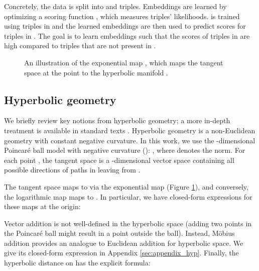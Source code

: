 \documentclass[11pt,a4paper]{article}
\begin{document}
Concretely, the data is split into  and  triples. 
Embeddings are learned by optimizing a scoring function , which measures triples' likelihoods.
 is trained using triples in  and the learned embeddings are then used to predict scores for triples in . 
The goal is to learn embeddings such that the scores of triples in  are high compared to triples that are not present in .  
\begin{figure}[t]
\centering
{}

\caption{An illustration of the exponential map  , which maps the tangent space   at the point  to the hyperbolic manifold .
}
\label{fig:expmap}
\end{figure} 
 \subsection{Hyperbolic geometry}\label{subsec:hyp_geom}
We briefly review key notions from hyperbolic geometry; a more in-depth treatment is available in standard texts \cite{robbin2011introduction}. 
Hyperbolic geometry is a non-Euclidean geometry with constant negative curvature. 
In this work, we use the -dimensional Poincar\'e ball model with negative curvature  (): , where  denotes the  norm. 
For each point , the tangent space  is a -dimensional vector space containing all possible directions of paths in  leaving from .

The tangent space  maps to  via the exponential map  (Figure \ref{fig:expmap}), and conversely, the logarithmic map maps  to . 
In particular, we have closed-form expressions for these maps at the origin:

Vector addition is not well-defined in the hyperbolic space (adding two points in the Poincar\'e ball might result in a point outside the ball). 
Instead, M\"obius addition  \cite{ganea2018hyperbolicNN} provides an analogue to Euclidean addition for hyperbolic space. 
We give its closed-form expression in Appendix \ref{sec:appendix_hyp}. 
Finally, the hyperbolic distance on  has the explicit formula:

 
\end{document}
